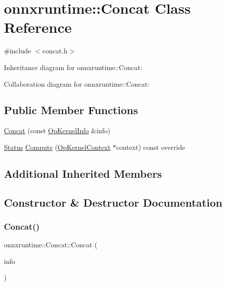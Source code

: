 \hypertarget{classonnxruntime_1_1Concat}{}\section{onnxruntime\+:\+:Concat Class Reference}
\label{classonnxruntime_1_1Concat}


{\ttfamily \#include $<$concat.\+h$>$}



Inheritance diagram for onnxruntime\+:\+:Concat\+:


Collaboration diagram for onnxruntime\+:\+:Concat\+:
\subsection*{Public Member Functions}
\begin{DoxyCompactItemize}
\item 
\mbox{\hyperlink{classonnxruntime_1_1Concat_a9175f42670eea80e7a155941c177b609}{Concat}} (const \mbox{\hyperlink{classonnxruntime_1_1OpKernelInfo}{Op\+Kernel\+Info}} \&info)
\item 
\mbox{\hyperlink{classonnxruntime_1_1common_1_1Status}{Status}} \mbox{\hyperlink{classonnxruntime_1_1Concat_aa778440d6e8b31cc239af8937522b6c0}{Compute}} (\mbox{\hyperlink{classonnxruntime_1_1OpKernelContext}{Op\+Kernel\+Context}} $\ast$context) const override
\end{DoxyCompactItemize}
\subsection*{Additional Inherited Members}


\subsection{Constructor \& Destructor Documentation}
\mbox{\label{classonnxruntime_1_1Concat_a9175f42670eea80e7a155941c177b609}} 
\subsubsection{\texorpdfstring{Concat()}{Concat()}}
{\footnotesize\ttfamily onnxruntime\+::\+Concat\+::\+Concat (\begin{DoxyParamCaption}\item[{const \mbox{\hyperlink{classonnxruntime_1_1OpKernelInfo}{Op\+Kernel\+Info}} \&}]{info }\end{DoxyParamCaption})\hspace{0.3cm}{\ttfamily [inline]}}



